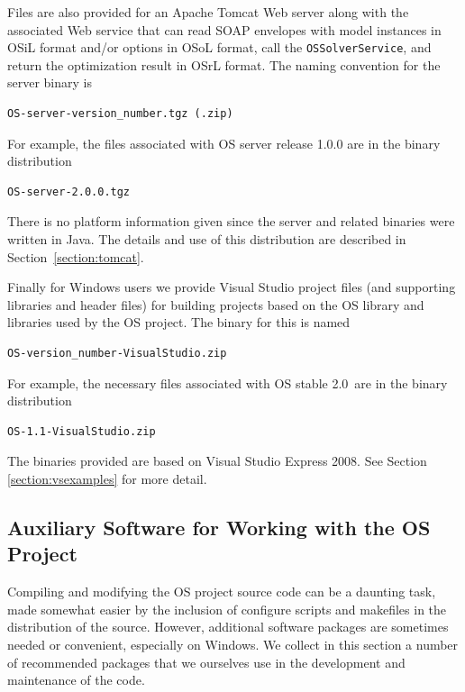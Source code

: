 \documentclass[11pt]{article}
\renewcommand{\_}{{\char"5F}}
\renewcommand{\{}{{\char"7B}}
\renewcommand{\}}{{\char"7D}}
\renewcommand{\^}{{\char"0D}}
\renewcommand{\'}{{\char"0D}}
\newcommand{\OSstable}{2.0}
\begin{document}
Files are also provided for an Apache Tomcat Web server along with the associated Web service
that can
read SOAP  envelopes with model instances in OSiL format and/or options in 
OSoL format, call the {\tt OSSolverService},
and return the optimization result in OSrL format.
The naming convention for the server binary is
\begin{verbatim}
OS-server-version_number.tgz (.zip)
\end{verbatim}
For example, the files associated with  OS server release 1.0.0 are in the binary distribution
\begin{verbatim}
OS-server-2.0.0.tgz
\end{verbatim}
There is no platform information given since the server and related binaries were written in Java.
The details and use of this distribution are described in Section~\ref{section:tomcat}.

Finally for Windows users we provide Visual Studio  project files (and supporting
libraries and header files) for building projects based on the OS library and libraries used by the OS project.
The binary for this is named
\begin{verbatim}
OS-version_number-VisualStudio.zip
\end{verbatim}
For example, the necessary files associated with  OS  stable \OSstable\ are in the binary 
distribution
\begin{verbatim}
OS-1.1-VisualStudio.zip
\end{verbatim}
The binaries provided are based on Visual Studio Express 2008.  See Section \ref{section:vsexamples} for more detail.

\subsection{Auxiliary Software for Working with the OS Project} \label{section:auxiliarydownloads}

Compiling and modifying the OS project source code can be a daunting task,
made somewhat easier by the inclusion of configure scripts and makefiles
in the distribution of the source. However, additional software packages are
sometimes needed or convenient, especially on Windows.
We collect in this section a number of recommended packages that we ourselves use in the development
and maintenance of the code.
\end{document}
